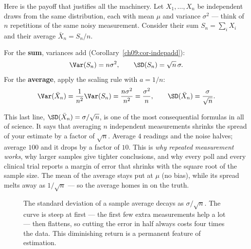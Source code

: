 Here is the payoff that justifies all the machinery. Let $X_1, \dots, X_n$ be
independent draws from the same distribution, each with mean $\mu$ and
variance $\sigma^2$ --- think of $n$ repetitions of the same noisy
measurement. Consider their sum $S_n = \sum_i X_i$ and their average
$\bar X_n = S_n / n$.

For the \textbf{sum}, variances add (Corollary~\ref{ch09:cor-indepadd}):
\[
  \Var(S_n) = n\sigma^2,
  \qquad
  \SD(S_n) = \sqrt{n}\,\sigma.
\]
For the \textbf{average}, apply the scaling rule with $a = 1/n$:
\[
  \Var(\bar X_n) = \frac{1}{n^2}\Var(S_n) = \frac{n\sigma^2}{n^2}
  = \frac{\sigma^2}{n},
  \qquad
  \SD(\bar X_n) = \frac{\sigma}{\sqrt{n}}.
\]

\begin{aestheticbox}
This last line, $\SD(\bar X_n) = \sigma/\sqrt{n}$, is one of the most
consequential formulas in all of science. It says that averaging $n$
independent measurements shrinks the spread of your estimate by a factor of
$\sqrt{n}$. Average $4$ readings and the noise halves; average $100$ and it
drops by a factor of $10$. This is \emph{why repeated measurement works}, why
larger samples give tighter conclusions, and why every poll and every clinical
trial reports a margin of error that shrinks with the square root of the
sample size. The mean of the average stays put at $\mu$ (no bias), while its
spread melts away as $1/\sqrt{n}$ --- so the average homes in on the truth.
\end{aestheticbox}

\begin{figure}[H]
\centering
{}
\caption{The standard deviation of a sample average decays as $\sigma/\sqrt
n$. The curve is steep at first --- the first few extra measurements help a
lot --- then flattens, so cutting the error in half always costs four times
the data. This diminishing return is a permanent feature of estimation.}
\label{ch09:fig-sqrtn}
\end{figure}

